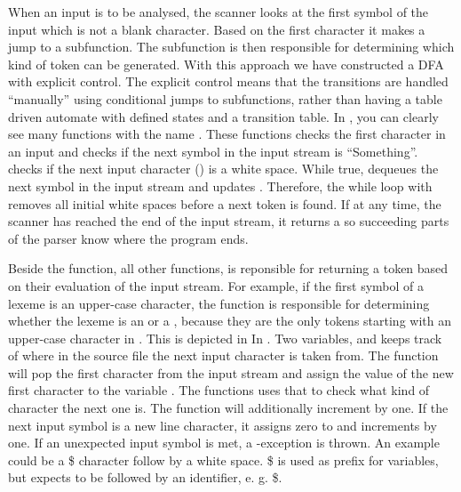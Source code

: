 When an input is to be analysed, the scanner looks at the first symbol of the input which is not a blank character. Based on the first character it makes a jump to a subfunction. The subfunction is then responsible for determining which kind of token can be generated. With this approach we have constructed a DFA with explicit control. The explicit control means that the transitions are handled ``manually'' using conditional jumps to subfunctions, rather than having a table driven automate with defined states and a transition table.
In , you can clearly see many functions with the name . These functions checks the first character in an input and checks if the next symbol in the input stream is ``Something''.  checks if the next input character () is a white space. While true,  dequeues the next symbol in the input stream and updates . Therefore, the while loop with  removes all initial white spaces before a next token is found. If at any time, the scanner has reached the end of the input stream, it returns a  so succeeding parts of the parser know where the program ends.

Beside the  function, all other  functions, is reponsible for returning a token based on their evaluation of the input stream.
For example, if the first symbol of a lexeme is an upper-case character, the function  is responsible for determining whether the lexeme is an  or a , because they are the only tokens starting with an upper-case character in \productname{}. This is depicted in In . Two variables,   and   keeps track of where in the source file the next input character is taken from. The function  will pop the first character from the input stream and assign the value of the new first character to the variable . The  functions uses that  to check what kind of character the next one is.
The  function will additionally increment  by one. If the next input symbol is a new line character, it assigns zero to   and increments  by one. If an unexpected input symbol is met, a -exception is thrown. An example could be a \$ character follow by a white space. \$ is used as prefix for variables, but expects to be followed by an identifier, e. g. \$.

